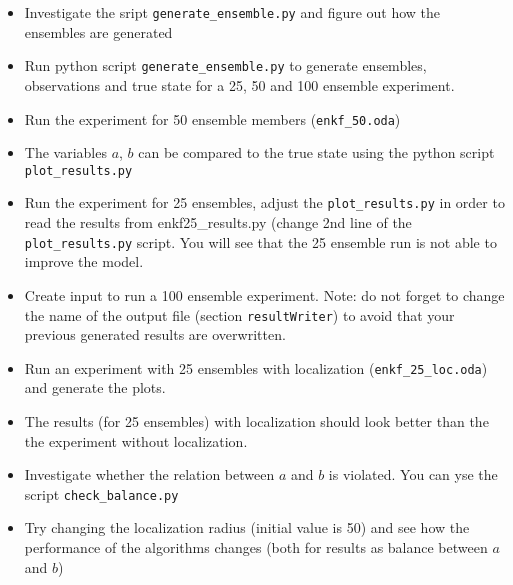 \begin{itemize}
\item Investigate the sript {\tt generate\_ensemble.py} and figure out how the ensembles are generated
\item Run python script {\tt generate\_ensemble.py} to generate ensembles, observations and true state for a 25, 50 and 100 ensemble experiment.  
\item Run the experiment for 50 ensemble members ({\tt enkf\_50.oda})
\item The variables $a$, $b$ can be compared to the true state using the python script {\tt plot\_results.py}
\item Run the experiment for 25 ensembles, adjust the {\tt plot\_results.py} in order to read the results from enkf25\_results.py (change 2nd line of the {\tt plot\_results.py} script. You will see that the 25 ensemble run is not able to improve the model.
\item Create input to run a 100 ensemble experiment. Note: do not forget to change the name of the output file (section {\tt resultWriter}) to avoid that your previous generated results are overwritten. 
\item Run an experiment with 25 ensembles with localization ({\tt enkf\_25\_loc.oda}) and generate the plots.
\item The results (for 25 ensembles) with localization should look better than the the experiment without localization.
\item Investigate whether the relation between $a$ and $b$ is violated. You can yse the script {\tt check\_balance.py}
\item Try changing the localization radius (initial value is 50) and see how the performance of the algorithms changes (both for results as balance between $a$ and $b$)
\end{itemize}








